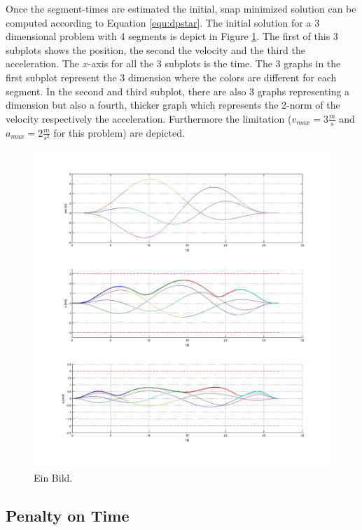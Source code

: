 Once the segment-times are estimated the initial, snap minimized solution can be computed according to Equation \ref{equ:dpstar}. The initial solution for a 3 dimensional problem with 4 segments is depict in Figure \ref{pic:initialSolution}. The first of this 3 subplots shows the position, the second the velocity and the third the acceleration. The $x$-axis for all the 3 subplots is the time. The 3 graphs in the first subplot represent the 3 dimension where the colors are different for each segment. In the second and third subplot, there are also 3 graphs representing a dimension but also a fourth, thicker graph which represents the 2-norm of the velocity respectively the acceleration. Furthermore the limitation ($v_{max} = 3 \frac{m}{s}$ and $a_{max} = 2 \frac{m}{s^2}$ for this problem) are depicted.

\begin{figure}[h]
   \centering
   \includegraphics[width=1\textwidth]{pics/initial.jpg}
   \caption{Ein Bild.}
   \label{pic:initialSolution}
\end{figure}

\subsection{Penalty on Time}\label{sec:penalty}

